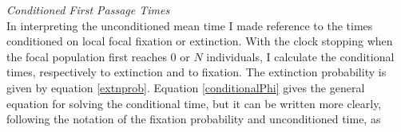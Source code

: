 \emph{Conditioned First Passage Times} \\
In interpreting the unconditioned mean time I made reference to the times conditioned on local focal fixation or extinction. 
With the clock stopping when the focal population first reaches $0$ or $N$ individuals, I calculate the conditional times, respectively to extinction and to fixation. 
The extinction probability is given by equation \ref{extnprob}. 
Equation \ref{conditionalPhi} gives the general equation for solving the conditional time, but it can be written more clearly, following the notation of the fixation probability and unconditioned time, as
